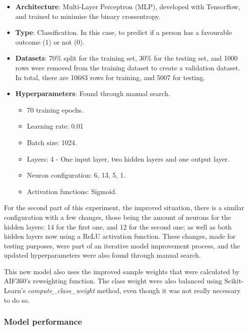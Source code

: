 \documentclass[fleqn,10pt]{wlscirep}
\begin{document}
\begin{itemize}
        \item \textbf{Architecture}: Multi-Layer Perceptron (MLP), developed with Tensorflow, and trained to minimise the binary crossentropy.
        \item \textbf{Type}: Classification. In this case, to predict if a person has a favourable outcome (1) or not (0).
        \item \textbf{Datasets}: 70\% split for the training set, 30\% for the testing set, and 1000 rows were removed from the training dataset to create a validation dataset. In total, there are 10683 rows for training, and 5007 for testing.
        \item \textbf{Hyperparameters}: Found through manual search.
            \begin{itemize}
                \item 70 training epochs.
                \item Learning rate: 0.01
                \item Batch size: 1024.
                \item Layers: 4 - One input layer, two hidden layers and one output layer.
                \item Neuron configuration: 6, 13, 5, 1.
                \item Activation functions: Sigmoid.
            \end{itemize}
\end{itemize}

For the second part of this experiment, the improved situation, there is a similar configuration with a few changes, those being the amount of neurons for the hidden layers: 14 for the first one, and 12 for the second one; as well as both hidden layers now using a ReLU activation function. These changes, made for testing purposes, were part of an iterative model improvement process, and the updated hyperparameters were also found through manual search.

This new model also uses the improved sample weights that were calculated by AIF360's reweighting function. The class weight were also balanced using Scikit-Learn's \textit{compute\_class\_weight} method, even though it was not really necessary to do so.

\subsubsection{Model performance}
\end{document}
